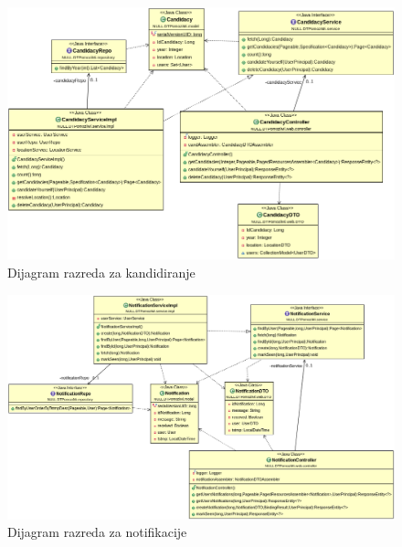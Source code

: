 			\begin{figure}[H]
				\includegraphics[scale=0.55]{slike/candidacyDiag.png} %
				\centering
				\caption { Dijagram razreda za kandidiranje}
				\label{fig:4.10}
			\end{figure}
		
		\begin{figure}[H]
			\includegraphics[scale=0.45]{slike/notifDiag.png} %
			\centering
			\caption { Dijagram razreda za notifikacije}
			\label{fig:4.11}
		\end{figure}
			
			

\newpage			

